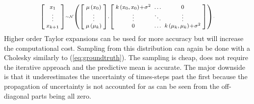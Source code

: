         \begin{equation}
        \label{naiveapprox}
            \footnotesize
            \setlength{\arraycolsep}{2.5pt}
            \medmuskip = 1mu %
            \centering
            \scriptscriptstyle
            \left[\scriptscriptstyle{\begin{array}{c}
            x_{1} \\
            \vdots \\
            x_{k+1}
            \end{array}}\right] \sim 
            \mathcal N \left(
            \left[\begin{array}{c}
            \mu\left(x_{0}\right) \\
            \vdots \\
            \mu\left(\mu_{k}\right)
            \end{array}\right] ,
            {\left[\begin{array}{ccc}
            k\left(x_{0}, x_{0}\right)+\sigma ^2 & \ldots & 0 \\
            \vdots & \ddots & \vdots \\
            0  & \ldots & k\left(\mu_{k}, \mu_{k}\right)+\sigma ^2
            \end{array}\right]} \right).
        \end{equation}
        Higher order Taylor expansions can be used for more accuracy but will increase the computational cost. Sampling from this distribution can again be done with a Cholesky similarly to (\ref{eq:groundtruth}). The sampling is cheap, does not require the iterative approach and the predictive mean is accurate. The major downside is that it underestimates the uncertainty of times-steps past the first because the propagation of uncertainty is not accounted for as can be seen from the off-diagonal parts being all zero.
    
